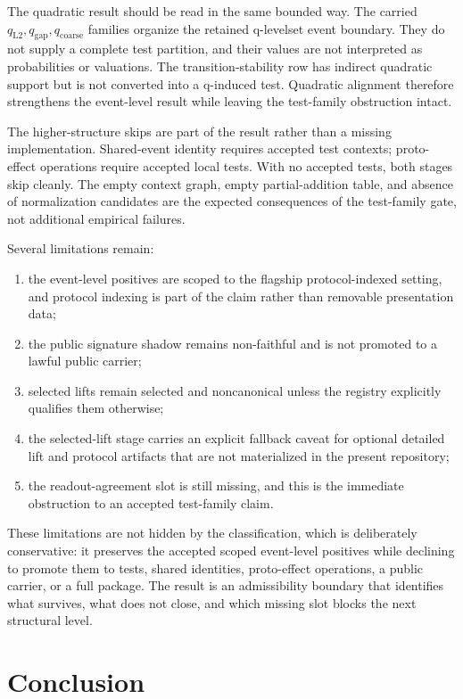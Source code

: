 \documentclass[11pt]{article}
\theoremstyle{definition}
\begin{document}
The quadratic result should be read in the same bounded way. The carried $q_{\mathrm{L2}}, q_{\mathrm{gap}}, q_{\mathrm{coarse}}$ families organize the retained q-levelset event boundary. They do not supply a complete test partition, and their values are not interpreted as probabilities or valuations. The transition-stability row has indirect quadratic support but is not converted into a q-induced test. Quadratic alignment therefore strengthens the event-level result while leaving the test-family obstruction intact.

The higher-structure skips are part of the result rather than a missing implementation. Shared-event identity requires accepted test contexts; proto-effect operations require accepted local tests. With no accepted tests, both stages skip cleanly. The empty context graph, empty partial-addition table, and absence of normalization candidates are the expected consequences of the test-family gate, not additional empirical failures.

Several limitations remain:
\begin{enumerate}[label=(\roman*),leftmargin=*,itemsep=1pt,topsep=2pt]
\item the event-level positives are scoped to the flagship protocol-indexed setting, and protocol indexing is part of the claim rather than removable presentation data;
\item the public signature shadow remains non-faithful and is not promoted to a lawful public carrier;
\item selected lifts remain selected and noncanonical unless the registry explicitly qualifies them otherwise;
\item the selected-lift stage carries an explicit fallback caveat for optional detailed lift and protocol artifacts that are not materialized in the present repository;
\item the readout-agreement slot is still missing, and this is the immediate obstruction to an accepted test-family claim.
\end{enumerate}

These limitations are not hidden by the classification, which is deliberately conservative: it preserves the accepted scoped event-level positives while declining to promote them to tests, shared identities, proto-effect operations, a public carrier, or a full package. The result is an admissibility boundary that identifies what survives, what does not close, and which missing slot blocks the next structural level.
 \section{Conclusion}
\label{sec:conclusion}
\end{document}
